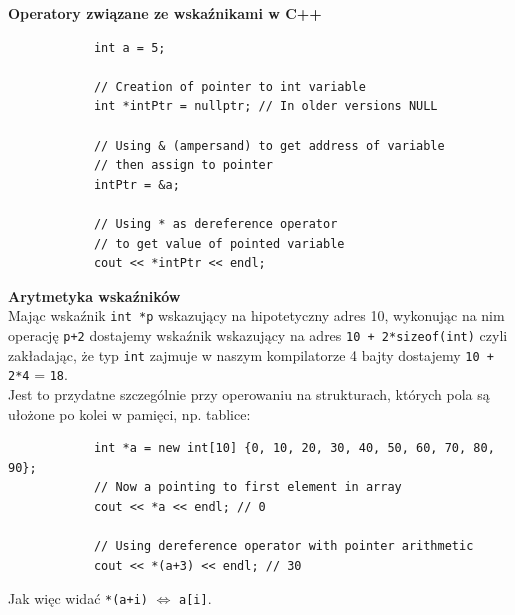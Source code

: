 \documentclass[12pt]{article}
\begin{document}
    \begin{definition}
        \textbf{Operatory związane ze wskaźnikami w C++}
        \begin{verbatim}
            int a = 5;

            // Creation of pointer to int variable
            int *intPtr = nullptr; // In older versions NULL

            // Using & (ampersand) to get address of variable
            // then assign to pointer
            intPtr = &a;

            // Using * as dereference operator
            // to get value of pointed variable
            cout << *intPtr << endl;
        \end{verbatim}
    \end{definition}

    \begin{definition}
        \textbf{Arytmetyka wskaźników} \\
        Mając wskaźnik \texttt{int *p} wskazujący na hipotetyczny adres 10, wykonując na nim operację \texttt{p+2} dostajemy wskaźnik wskazujący na adres \texttt{10 + 2*sizeof(int)}
        czyli zakładając, że typ \texttt{int} zajmuje w naszym kompilatorze 4 bajty dostajemy \texttt{10 + 2*4} = \texttt{18}. \\
        Jest to przydatne szczególnie przy operowaniu na strukturach, których pola są ułożone po kolei w pamięci, np. tablice:
        \begin{verbatim}
            int *a = new int[10] {0, 10, 20, 30, 40, 50, 60, 70, 80, 90};
            // Now a pointing to first element in array
            cout << *a << endl; // 0

            // Using dereference operator with pointer arithmetic
            cout << *(a+3) << endl; // 30
        \end{verbatim}
        Jak więc widać \texttt{*(a+i)} $\Leftrightarrow$ \texttt{a[i]}.
    \end{definition}
\end{document}
